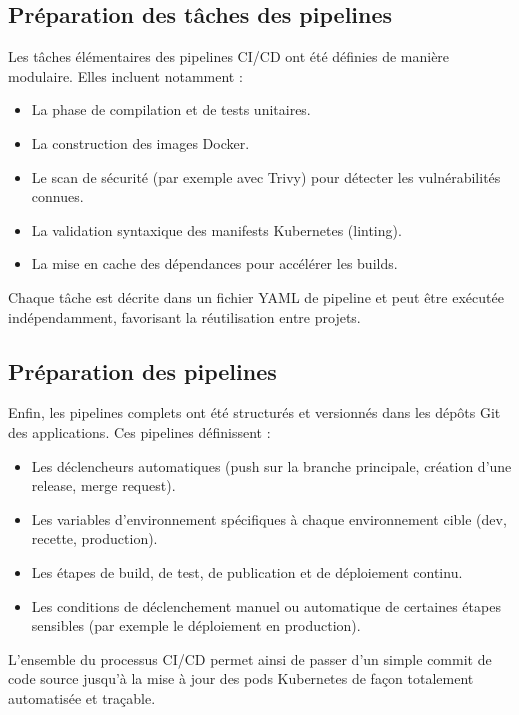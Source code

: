 \subsection{Préparation des tâches des pipelines}

Les tâches élémentaires des pipelines CI/CD ont été définies de manière modulaire.
Elles incluent notamment :
\begin{itemize}
	\item La phase de compilation et de tests unitaires.
	\item La construction des images Docker.
	\item Le scan de sécurité (par exemple avec Trivy) pour détecter les vulnérabilités connues.
	\item La validation syntaxique des manifests Kubernetes (linting).
	\item La mise en cache des dépendances pour accélérer les builds.
\end{itemize}

Chaque tâche est décrite dans un fichier YAML de pipeline et peut être exécutée indépendamment, favorisant la réutilisation entre projets.

\subsection{Préparation des pipelines}

Enfin, les pipelines complets ont été structurés et versionnés dans les dépôts Git des applications.
Ces pipelines définissent :
\begin{itemize}
	\item Les déclencheurs automatiques (push sur la branche principale, création d’une release, merge request).
	\item Les variables d’environnement spécifiques à chaque environnement cible (dev, recette, production).
	\item Les étapes de build, de test, de publication et de déploiement continu.
	\item Les conditions de déclenchement manuel ou automatique de certaines étapes sensibles (par exemple le déploiement en production).
\end{itemize}

L’ensemble du processus CI/CD permet ainsi de passer d’un simple commit de code source jusqu’à la mise à jour des pods Kubernetes de façon totalement automatisée et traçable.